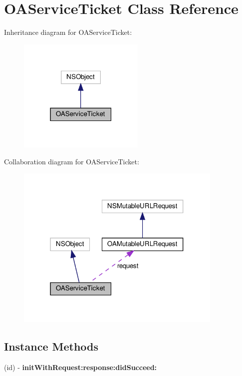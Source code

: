 \hypertarget{interfaceOAServiceTicket}{}\section{O\+A\+Service\+Ticket Class Reference}
\label{interfaceOAServiceTicket}


Inheritance diagram for O\+A\+Service\+Ticket\+:
\nopagebreak
\begin{figure}[H]
\begin{center}
\leavevmode
\includegraphics[width=171pt]{interfaceOAServiceTicket__inherit__graph}
\end{center}
\end{figure}


Collaboration diagram for O\+A\+Service\+Ticket\+:
\nopagebreak
\begin{figure}[H]
\begin{center}
\leavevmode
\includegraphics[width=280pt]{interfaceOAServiceTicket__coll__graph}
\end{center}
\end{figure}
\subsection*{Instance Methods}
\begin{DoxyCompactItemize}
\item 
\mbox{\label{interfaceOAServiceTicket_a0a0ebc57e222e5c5229e4280a294cfff}} 
(id) -\/ {\bfseries init\+With\+Request\+:response\+:did\+Succeed\+:}
\end{DoxyCompactItemize}
